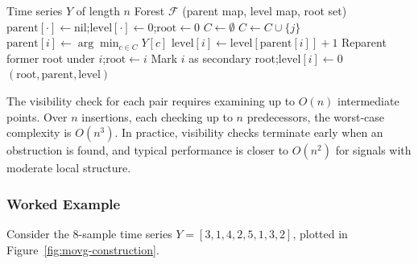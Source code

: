\documentclass[a4paper,12pt]{article}
\begin{document}
\begin{algorithm}[H]
\caption{Incremental MOVG Construction}
\label{alg:build-movg}
\begin{algorithmic}[1]
\Require Time series $Y$ of length $n$
\Ensure Forest $\mathcal{F}$ (parent map, level map, root set)
    \State $\text{parent}[\cdot] \gets \text{nil}$;\quad $\text{level}[\cdot] \gets 0$;\quad $\text{root} \gets 0$
     
        \State $C \gets \emptyset$
         
                \State $C \gets C \cup \{j\}$
            \EndIf
        \EndFor
            \State $\text{parent}[i] \gets \arg\min_{c \in C} Y[c]$ 
            \State $\text{level}[i] \gets \text{level}[\text{parent}[i]] + 1$
            \State Reparent former root under $i$;\quad $\text{root} \gets i$ 
        \Else
            \State Mark $i$ as secondary root;\quad $\text{level}[i] \gets 0$
        \EndIf
    \EndFor
    \State \Return $(\text{root}, \text{parent}, \text{level})$
\EndFunction
\end{algorithmic}
\end{algorithm}

The visibility check for each pair requires examining up to $O(n)$ intermediate points. Over $n$ insertions, each checking up to $n$ predecessors, the worst-case complexity is $O(n^3)$. In practice, visibility checks terminate early when an obstruction is found, and typical performance is closer to $O(n^2)$ for signals with moderate local structure.

\subsubsection{Worked Example}

Consider the 8-sample time series $Y = [3, 1, 4, 2, 5, 1, 3, 2]$, plotted in Figure~\ref{fig:movg-construction}.
\end{document}
